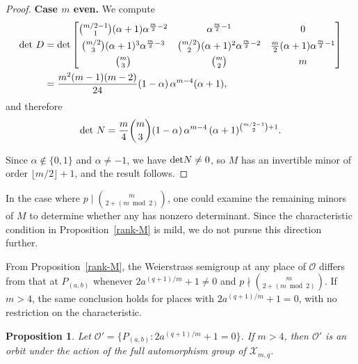 \documentclass[12pt]{amsart}
\newtheorem{proposition}[theorem]{Proposition}
\theoremstyle{remark}
\theoremstyle{definition}
\def\det{{\rm det}}
\begin{document}
\begin{proof}
    \noindent\textbf{Case $m$ even.} We compute
    \begin{align*}
        \det~D 
        &= \det\begin{bmatrix}
            \binom{m/2-1}{1}(\alpha+1)\alpha^{\frac{m}{2}-2} 
                & \alpha^{\frac{m}{2}-1} & 0 \\[4pt]
            \binom{m/2}{3}(\alpha+1)^3\alpha^{\frac{m}{2}-3} 
                & \binom{m/2}{2}(\alpha+1)^2\alpha^{\frac{m}{2}-2} 
                & \frac{m}{2}(\alpha+1)\alpha^{\frac{m}{2}-1} \\[4pt]
            \binom{m}{3} & \binom{m}{2} & m
        \end{bmatrix} \\
        &= \frac{m^2(m-1)(m-2)}{24}(1-\alpha)\,\alpha^{m-4}(\alpha+1),
    \end{align*}
    and therefore
    \[
        \det~N = \frac{m}{4}\binom{m}{3}
        (1-\alpha)\,\alpha^{m-4}\,(\alpha+1)^{\binom{m/2-1}{2}+1}.
    \]

    Since $\alpha \notin \{0, 1\}$ and $\alpha \neq -1$, we have 
    $\det N \neq 0$, so $M$ has an invertible minor of order 
    $\lfloor m/2 \rfloor + 1$, and the result follows.
\end{proof}

In the case where $p \mid \binom{m}{2 + (m \bmod 2)}$, one could 
examine the remaining minors of $M$ to determine whether any has nonzero 
determinant. Since the characteristic condition in Proposition~\ref{rank-M} 
is mild, we do not pursue this direction further.

From Proposition~\ref{rank-M}, the Weierstrass semigroup at any place of 
$\mathcal{O}$ differs from that at $P_{(a,b)}$ whenever 
$2a^{(q+1)/m} + 1 \neq 0$ and $p \nmid \binom{m}{2+(m \bmod 2)}$. 
If $m > 4$, the same conclusion holds for places with 
$2a^{(q+1)/m} + 1 = 0$, with no restriction on the characteristic.

\begin{proposition}\label{o-linha}
    Let $\mathcal{O}' = \{P_{(a,b)} : 2a^{(q+1)/m} + 1 = 0\}$. 
    If $m > 4$, then $\mathcal{O}'$ is an orbit under the action of the 
    full automorphism group of $\mathcal{X}_{m,q}$.
\end{proposition}
\end{document}
